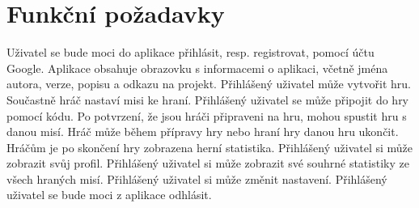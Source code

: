 \section{Funkční požadavky}

\blind[1]

\begin{enumerate}[label=\textbf{F\arabic*}, ref=F\arabic*]
Uživatel se bude moci do aplikace přihlásit, resp. registrovat,
pomocí účtu Google.
Aplikace obsahuje obrazovku s informacemi o aplikaci,
včetně jména autora, verze, popisu a odkazu na projekt.
Přihlášený uživatel může vytvořit hru.
Součastně hráč nastaví misi ke hraní.
Přihlášený uživatel se může připojit do hry pomocí kódu.
Po potvrzení, že jsou hráči připraveni na hru,
mohou spustit hru s danou misí.
Hráč může během přípravy hry nebo hraní hry danou hru ukončit.
Hráčům je po skončení hry zobrazena herní statistika.
Přihlášený uživatel si může zobrazit svůj profil.
Přihlášený uživatel si může zobrazit své souhrné statistiky
ze všech hraných misí.
    \label{req:settings}
Přihlášený uživatel si může změnit nastavení.
    \label{req:logout}
Přihlášený uživatel se bude moci z aplikace odhlásit.
\end{enumerate}
